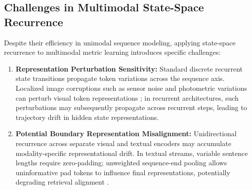 \documentclass[journal]{IEEEtran}
\begin{document}
\subsection{Challenges in Multimodal State-Space Recurrence}
Despite their efficiency in unimodal sequence modeling, applying state-space recurrence to multimodal metric learning introduces specific challenges:
\begin{enumerate}
    \item \textbf{Representation Perturbation Sensitivity:} Standard discrete recurrent state transitions propagate token variations across the sequence axis. Localized image corruptions such as sensor noise and photometric variations can perturb visual token representations \cite{hendrycks2019benchmarking}; in recurrent architectures, such perturbations may subsequently propagate across recurrent steps, leading to trajectory drift in hidden state representations.
    \item \textbf{Potential Boundary Representation Misalignment:} Unidirectional recurrence across separate visual and textual encoders may accumulate modality-specific representational drift. In textual streams, variable sentence lengths require zero-padding; unweighted sequence-end pooling allows uninformative pad tokens to influence final representations, potentially degrading retrieval alignment \cite{devlin2018bert,faghri2017vse++}.
\end{enumerate}
\end{document}
